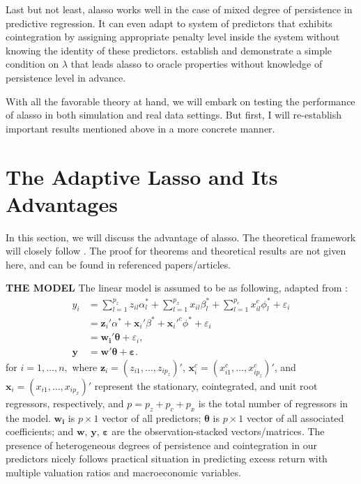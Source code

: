 \documentclass[12pt,a4paper]{article}
\begin{document}
Last but not least, alasso works well in the case of mixed degree of persistence in predictive regression. It can even adapt to system of predictors that exhibits cointegration by assigning appropriate penalty level inside the system without knowing the identity of these predictors. \cite{lee2018lasso} establish and demonstrate a simple condition on $\lambda$ that leads alasso to oracle properties without knowledge of persistence level in advance.

With all the favorable theory at hand, we will embark on testing the performance of alasso in both simulation and real data settings. But first, I will re-establish important results mentioned above in a more concrete manner.

\section{The Adaptive Lasso and Its Advantages}
In this section, we will discuss the advantage of alasso. The theoretical framework will closely follow \cite{tibshirani1996regression, knight2008shrinkage, zou2006adaptive, lee2018lasso}. The proof for theorems and theoretical results are not given here, and can be found in referenced papers/articles. 

\textbf{THE MODEL}
The linear model is assumed to be as following, adapted from \cite{lee2018lasso}: \begin{equation}\label{eq:1}
\begin{aligned}
	y_i & = \sum_{l=1}^{p_z}z_{il}\alpha_{l}^{*} + 
	\sum_{l=1}^{p_x}x_{il}\beta_{l}^{*} + 
	\sum_{l=1}^{p_c}x_{il}^c\phi_{l}^{*} +
	\varepsilon_i \\
		& = \bm{z}_i'\alpha^* + 
		\bm{x}_i'\beta^* + 
		\bm{x}_i'^c\phi^* + \varepsilon_i \\
		& = \bm{w_i}'\bm{\theta} + \varepsilon_i, \\
	\bm{y} & = \bm{w}'\bm{\theta} + \bm{\varepsilon}.
\end{aligned}
\end{equation}
for $ i = 1,\ldots, n, $ where $ \bm{z}_i = (z_{i1}, \ldots, z_{ip_z})' $, $ \bm{x}^c_i = (x^c_{i1}, \ldots, x^c_{ip_z})' $, and $ \bm{x}_i = (x_{i1}, \ldots, x_{ip_x})' $ represent the stationary, cointegrated, and unit root regressors, respectively, and $p = p_z + p_c + p_x$ is the total number of regressors in the model. $\bm{w_i}$ is $ p \times 1 $ vector of all predictors; $\bm{\theta}$ is $p \times 1$  vector of all associated coefficients; and $ \bm{w} $, $ \bm{y} $, $ \bm{\varepsilon} $ are the observation-stacked vectors/matrices.  The presence of heterogeneous degrees of persistence and cointegration in our predictors nicely follows practical situation in predicting excess return with multiple valuation ratios and macroeconomic variables.
\end{document}
